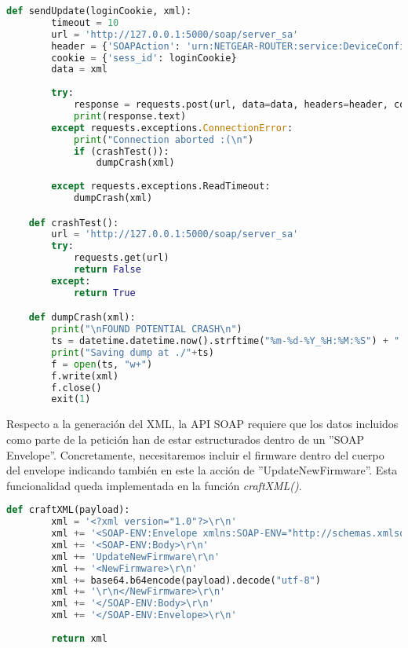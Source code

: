 \begin{lstlisting}[language=python, caption=Envío de actualización de firmware al servicio UPNP., captionpos=b,
    frame=single, breaklines, showstringspaces=false]
    def sendUpdate(loginCookie, xml):
        timeout = 10
        url = 'http://127.0.0.1:5000/soap/server_sa'
        header = {'SOAPAction': 'urn:NETGEAR-ROUTER:service:DeviceConfig:1#UpdateNewFirmware'}
        cookie = {'sess_id': loginCookie}
        data = xml
        
        try:
            response = requests.post(url, data=data, headers=header, cookies=cookie, timeout=timeout)
            print(response.text)
        except requests.exceptions.ConnectionError:
            print("Connection aborted :(\n")
            if (crashTest()):
                dumpCrash(xml)
                
        except requests.exceptions.ReadTimeout:
            dumpCrash(xml)

    def crashTest():
        url = 'http://127.0.0.1:5000/soap/server_sa'
        try:
            requests.get(url)
            return False
        except:
            return True

    def dumpCrash(xml):
        print("\nFOUND POTENTIAL CRASH\n")
        ts = datetime.datetime.now().strftime("%m-%d-%Y_%H:%M:%S") + ".dmp"
        print("Saving dump at ./"+ts)
        f = open(ts, "w+")
        f.write(xml)
        f.close()
        exit(1)
\end{lstlisting}

Respecto a la generación del XML, la API SOAP requiere que los datos incluidos como parte de la petición han de estar estructurados 
dentro de un ''SOAP Envelope''. Concretamente, necesitaremos incluir el firmware dentro del cuerpo del envelope indicando también en este 
la acción de ''UpdateNewFirmware''. Esta funcionalidad queda implementada en la función \textit{craftXML()}.

\begin{lstlisting}[language=python, caption=Generación del XML envelope con el firmware para la actualización desde UPNP., captionpos=b,
    frame=single, breaklines, showstringspaces=false]
    def craftXML(payload):
        xml = '<?xml version="1.0"?>\r\n'
        xml += '<SOAP-ENV:Envelope xmlns:SOAP-ENV="http://schemas.xmlsoap.org/soap/envelope/" SOAP-ENV:encodingStyle="http://schemas.xmlsoap.$\r\n'
        xml += '<SOAP-ENV:Body>\r\n'
        xml += 'UpdateNewFirmware\r\n'
        xml += '<NewFirmware>\r\n'
        xml += base64.b64encode(payload).decode("utf-8")
        xml += '\r\n</NewFirmware>\r\n'
        xml += '</SOAP-ENV:Body>\r\n'
        xml += '</SOAP-ENV:Envelope>\r\n'
        
        return xml
\end{lstlisting}

